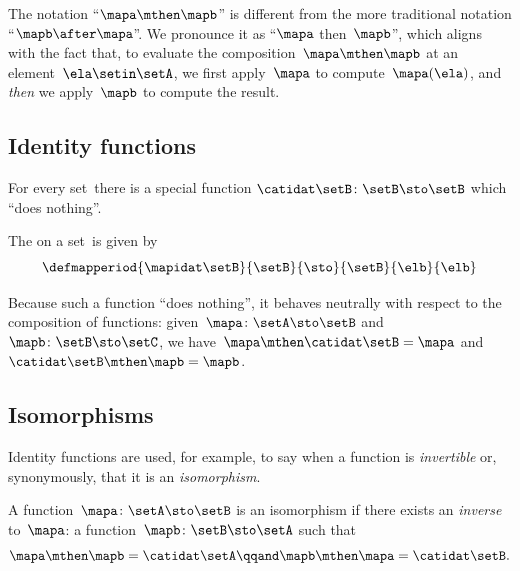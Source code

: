 The notation ``$\mapa \mthen \mapb$'' is different from the more traditional notation ``$\mapb \after \mapa$''.
We pronounce it as ``$\mapa$ then~$\mapb$'', which aligns with the fact that, to evaluate the composition~$\mapa \mthen \mapb$ at an element~$\ela \setin\setA$, we first apply~$\mapa$ to compute~$\mapa(\ela)$, and \emph{then} we apply~$\mapb$ to compute the result.

\subsection{Identity functions}

For every set~\setB there is a special function $\catidat\setB \colon \setB \sto \setB$ which ``does nothing''.
\begin{ctdefinition}\label{def:identity-function}
    The  on a set~\setB is given by
    \begin{equation}
        \defmapperiod{
            \mapidat\setB
        }{
            \setB
        }{
            \sto
        }{
            \setB
        }{
            \elb
        }{
            \elb
        }
    \end{equation}
\end{ctdefinition}
Because such a function ``does nothing'', it behaves neutrally with respect to the composition of functions: given~$\mapa \colon \setA \sto \setB$ and~$\mapb \colon \setB \sto \setC$, we have~$\mapa \mthen \catidat\setB = \mapa$ and~$\catidat\setB \mthen \mapb = \mapb$.

\begin{marginfigure}
    \centering
    \caption{An identity function}
    \label{fig:identity-function}
\end{marginfigure}

\subsection{Isomorphisms}

Identity functions are used, for example, to say when a function is \emph{invertible} or, synonymously, that it is an \emph{isomorphism}.

\begin{ctdefinition}[Isomorphism]
    \label{def:function-isomorphism}
    A function~$\mapa \colon \setA \sto \setB$ is an isomorphism if there exists an \emph{inverse} to~$\mapa$: a function~$\mapb \colon \setB \sto \setA$ such that
    \begin{equation}
        \label{eq:isomorphism-equations}
        \mapa \mthen \mapb = \catidat\setA
        \qqand
        \mapb \mthen \mapa = \catidat\setB.
    \end{equation}
\end{ctdefinition}

